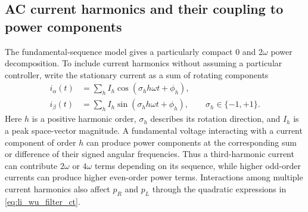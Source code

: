
\subsection{AC current harmonics and their coupling to power components}
The fundamental-sequence model gives a particularly compact \(0\) and \(2\omega\) power decomposition. To include current harmonics without assuming a particular controller, write the stationary current as a sum of rotating components
\begin{equation}\label{eq:wu_harmonic_general}
\begin{aligned}
i_\alpha(t)&=\sum_h I_h\cos(\sigma_h h\omega t+\phi_h),\\
i_\beta(t)&=\sum_h I_h\sin(\sigma_h h\omega t+\phi_h),
\qquad \sigma_h\in\{-1,+1\}.
\end{aligned}
\end{equation}
Here \(h\) is a positive harmonic order, \(\sigma_h\) describes its rotation direction, and \(I_h\) is a peak space-vector magnitude. A fundamental voltage interacting with a current component of order \(h\) can produce power components at the corresponding sum or difference of their signed angular frequencies. Thus a third-harmonic current can contribute \(2\omega\) or \(4\omega\) terms depending on its sequence, while higher odd-order currents can produce higher even-order power terms. Interactions among multiple current harmonics also affect \(p_R\) and \(p_L\) through the quadratic expressions in \eqref{eq:li_wu_filter_ct}.

